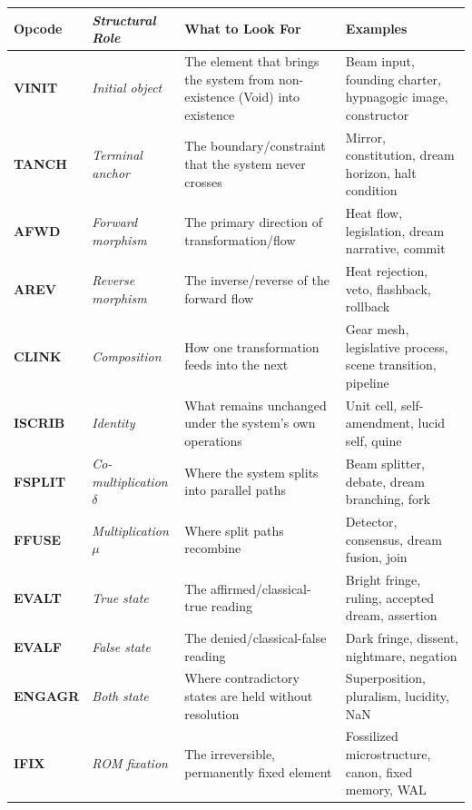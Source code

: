 \documentclass[12pt,a4paper]{article}
\begin{document}
{\small
\begin{tabularx}{\textwidth}{>{\bfseries}p{2.8cm} >{\itshape}p{3.2cm} >{\raggedright\arraybackslash}p{6.8cm}X}
\toprule
{\bf Opcode} & {\bf Structural Role} & {\bf What to Look For} & {\bf Examples} \\
\midrule
VINIT & Initial object & The element that brings the system from non-existence (Void) into existence & Beam input, founding charter, hypnagogic image, constructor \\
TANCH & Terminal anchor & The boundary/constraint that the system never crosses & Mirror, constitution, dream horizon, halt condition \\
AFWD & Forward morphism & The primary direction of transformation/flow & Heat flow, legislation, dream narrative, commit \\
AREV & Reverse morphism & The inverse/reverse of the forward flow & Heat rejection, veto, flashback, rollback \\
CLINK & Composition & How one transformation feeds into the next & Gear mesh, legislative process, scene transition, pipeline \\
ISCRIB & Identity & What remains unchanged under the system's own operations & Unit cell, self-amendment, lucid self, quine \\
FSPLIT & Co-multiplication $\delta$ & Where the system splits into parallel paths & Beam splitter, debate, dream branching, fork \\
FFUSE & Multiplication $\mu$ & Where split paths recombine & Detector, consensus, dream fusion, join \\
EVALT & True state & The affirmed/classical-true reading & Bright fringe, ruling, accepted dream, assertion \\
EVALF & False state & The denied/classical-false reading & Dark fringe, dissent, nightmare, negation \\
ENGAGR & Both state & Where contradictory states are held without resolution & Superposition, pluralism, lucidity, NaN \\
IFIX & ROM fixation & The irreversible, permanently fixed element & Fossilized microstructure, canon, fixed memory, WAL \\
\bottomrule
\end{tabularx}
}
\end{document}

